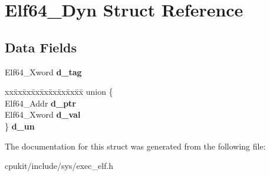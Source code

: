 \hypertarget{structElf64__Dyn}{}\section{Elf64\+\_\+\+Dyn Struct Reference}
\label{structElf64__Dyn}
\subsection*{Data Fields}
\begin{DoxyCompactItemize}
\item 
\mbox{\label{structElf64__Dyn_a7e8a8e8db55af7a621ac65a7ba01fb68}} 
Elf64\+\_\+\+Xword {\bfseries d\+\_\+tag}
\item 
\mbox{\label{structElf64__Dyn_a5fd57efb7aa085bed737cb97ff7f95a0}} 
\begin{tabbing}
xx\=xx\=xx\=xx\=xx\=xx\=xx\=xx\=xx\=\kill
union \{\\
\>Elf64\_Addr {\bfseries d\_ptr}\\
\>Elf64\_Xword {\bfseries d\_val}\\
\} {\bfseries d\_un}\\

\end{tabbing}\end{DoxyCompactItemize}


The documentation for this struct was generated from the following file\+:\begin{DoxyCompactItemize}
\item 
cpukit/include/sys/exec\+\_\+elf.\+h\end{DoxyCompactItemize}
